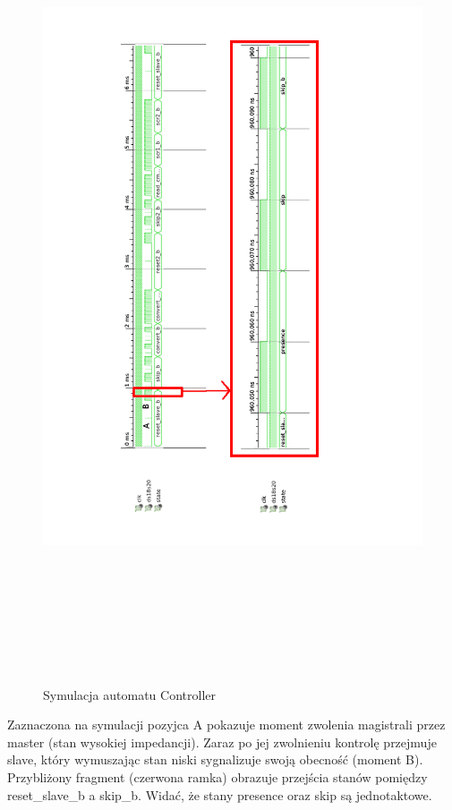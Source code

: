 \documentclass[a4paper]{article}
\begin{document}
\begin{figure}[!h]
\begin{center}
\includegraphics[height=24cm]{graphics/controller_symulation.png}
\end{center}
\caption{Symulacja automatu Controller}
\label{controller_sym}
\end{figure}

Zaznaczona na symulacji pozyjca A pokazuje moment zwolenia magistrali przez master (stan wysokiej impedancji). Zaraz po jej zwolnieniu kontrolę przejmuje slave, który wymuszając stan niski sygnalizuje swoją obecność (moment B). Przybliżony fragment (czerwona ramka) obrazuje przejścia stanów pomiędzy reset\_slave\_b a skip\_b. Widać, że stany presence oraz skip są jednotaktowe. 
\end{document}
